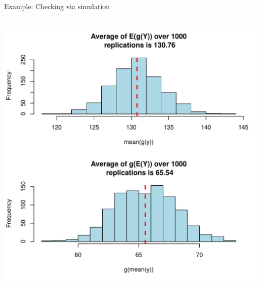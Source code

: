 \documentclass[10pt,handout]{beamer}\usepackage[]{graphicx}\usepackage[]{color}
\makeatletter
\def\maxwidth{ %
  \ifdim\Gin@nat@width>\linewidth
    \linewidth
  \else
    \Gin@nat@width
  \fi
}
\newenvironment{knitrout}{}{} %
\makeatother
\begin{document}
\begin{frame}[fragile]{Example: Checking via simulation}
\begin{columns}
\begin{column}{0.5\textwidth}
\begin{knitrout}
{\centering \includegraphics[width=\maxwidth]{figure/unnamed-chunk-16-1} 

}


\end{knitrout}
		\end{column}
	\end{columns}
\end{frame}
\end{document}
